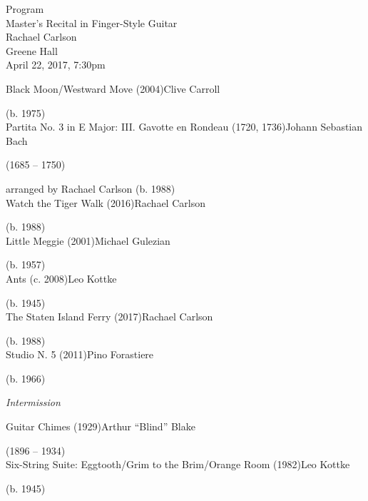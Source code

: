 \documentclass{tufte-handout}
\begin{document}
\begin{fullwidth}
\begin{center}
  Program\\
  Master's Recital in Finger-Style Guitar\\
  Rachael Carlson\\
  Greene Hall\\
  April 22, 2017, 7:30pm
\end{center}
\noindent Black Moon/Westward Move (2004)\dotfill Clive Carroll\\
\strut \hfill (b. 1975)\\

\noindent Partita No. 3 in E Major: III. Gavotte en Rondeau (1720, 1736)\dotfill Johann Sebastian Bach\\
\strut \hfill (1685 -- 1750)\\
\strut\hfill arranged by Rachael Carlson (b. 1988)\\

\noindent Watch the Tiger Walk (2016)\dotfill Rachael Carlson\\
\strut\hfill (b. 1988)\\

\noindent Little Meggie (2001)\dotfill Michael Gulezian\\
\strut \hfill (b. 1957)\\

\noindent Ants (c. 2008)\dotfill Leo Kottke\\
\strut\hfill (b. 1945)\\

\noindent The Staten Island Ferry (2017)\dotfill Rachael Carlson\\
\strut\hfill (b. 1988)\\

\noindent Studio N. 5 (2011)\dotfill Pino Forastiere\\
\strut\hfill (b. 1966)\\

\begin{center}
  \emph{Intermission}
\end{center}

\noindent Guitar Chimes (1929)\dotfill Arthur ``Blind'' Blake\\
\strut\hfill (1896 -- 1934)\\

\noindent Six-String Suite: Eggtooth/Grim to the Brim/Orange Room (1982)\dotfill Leo Kottke\\
\strut\hfill (b. 1945)\\


\end{fullwidth}
\end{document}
